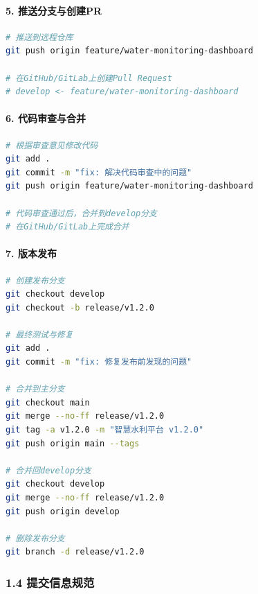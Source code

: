 \paragraph{5.
推送分支与创建PR}\label{ux63a8ux9001ux5206ux652fux4e0eux521bux5efapr}

\begin{lstlisting}[language=bash]
# 推送到远程仓库
git push origin feature/water-monitoring-dashboard

# 在GitHub/GitLab上创建Pull Request
# develop <- feature/water-monitoring-dashboard
\end{lstlisting}

\paragraph{6.
代码审查与合并}\label{ux4ee3ux7801ux5ba1ux67e5ux4e0eux5408ux5e76}

\begin{lstlisting}[language=bash]
# 根据审查意见修改代码
git add .
git commit -m "fix: 解决代码审查中的问题"
git push origin feature/water-monitoring-dashboard

# 代码审查通过后，合并到develop分支
# 在GitHub/GitLab上完成合并
\end{lstlisting}

\paragraph{7. 版本发布}\label{ux7248ux672cux53d1ux5e03}

\begin{lstlisting}[language=bash]
# 创建发布分支
git checkout develop
git checkout -b release/v1.2.0

# 最终测试与修复
git add .
git commit -m "fix: 修复发布前发现的问题"

# 合并到主分支
git checkout main
git merge --no-ff release/v1.2.0
git tag -a v1.2.0 -m "智慧水利平台 v1.2.0"
git push origin main --tags

# 合并回develop分支
git checkout develop
git merge --no-ff release/v1.2.0
git push origin develop

# 删除发布分支
git branch -d release/v1.2.0
\end{lstlisting}

\subsubsection{1.4
提交信息规范}\label{ux63d0ux4ea4ux4fe1ux606fux89c4ux8303}


